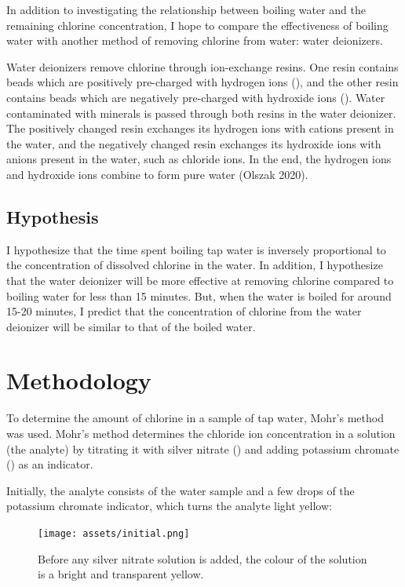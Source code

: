 \documentclass[11pt]{article}
\begin{document}
In addition to investigating the relationship between boiling water and the remaining chlorine concentration, I hope to compare the effectiveness of boiling water with another method of removing chlorine from water: water deionizers.

Water deionizers remove chlorine through ion-exchange resins. One resin contains beads which are positively pre-charged with hydrogen ions (), and the other resin contains beads which are negatively pre-charged with hydroxide ions (). Water contaminated with minerals is passed through both resins in the water deionizer. The positively changed resin exchanges its hydrogen ions with cations present in the water, and the negatively changed resin exchanges its hydroxide ions with anions present in the water, such as chloride ions. In the end, the hydrogen ions and hydroxide ions combine to form pure water  (Olszak 2020).

\subsection{Hypothesis}
I hypothesize that the time spent boiling tap water is inversely proportional to the concentration of dissolved chlorine in the water. In addition, I hypothesize that the water deionizer will be more effective at removing chlorine compared to boiling water for less than 15 minutes. But, when the water is boiled for around 15-20 minutes, I predict that the concentration of chlorine from the water deionizer will be similar to that of the boiled water.

\section{Methodology}

To determine the amount of chlorine in a sample of tap water, Mohr's method was used. Mohr's method determines the chloride ion concentration in a solution (the analyte) by titrating it with silver nitrate () and adding potassium chromate () as an indicator.

Initially, the analyte consists of the water sample and a few drops of the potassium chromate indicator, which turns the analyte light yellow:

\begin{figure}[H]
	\centering
	\texttt{[image: assets/initial.png]}
	\caption{Before any silver nitrate solution is added, the colour of the solution is a bright and transparent yellow.}
\end{figure}
\end{document}
